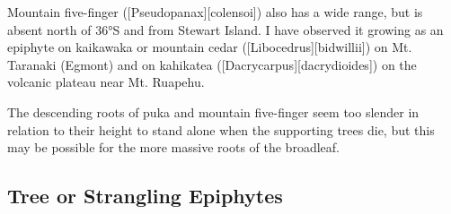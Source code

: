 Mountain five-finger ([Pseudopanax][colensoi]) also has a wide range, but is absent north of \ang{36}S and from Stewart Island.
I have observed it growing as an epiphyte on kaikawaka or mountain cedar ([Libocedrus][bidwillii]) on Mt.
Taranaki (Egmont) and on kahikatea ([Dacrycarpus][dacrydioides]) on the volcanic plateau near Mt.
Ruapehu.

The descending roots of puka and mountain five-finger seem too slender in relation to their height to stand alone when the supporting trees die, but this may be possible for the more massive roots of the broadleaf.

\subsection{Tree or Strangling Epiphytes}

